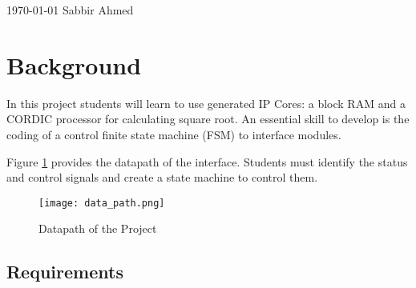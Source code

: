 \documentclass[paper=usletter, fontsize=12pt]{article}
\begin{document}
    {\today} {Sabbir Ahmed}
    \vspace{-0.1in}

    \section{Background} In this project students will learn to use generated
    IP Cores: a block RAM and a CORDIC processor for calculating square root.
    An essential skill to develop is the coding of a control finite state
    machine (FSM) to interface modules.

    Figure \ref{fig:datapath} provides the datapath of the interface. Students
    must identify the status and control signals and create a state machine to
    control them.
    \begin{figure}[ht]
        \begin{center}
            \texttt{[image: data\_path.png]}
            \caption{Datapath of the Project}
            \label{fig:datapath}
        \end{center}
    \end{figure}
        \subsection{Requirements}
\end{document}
